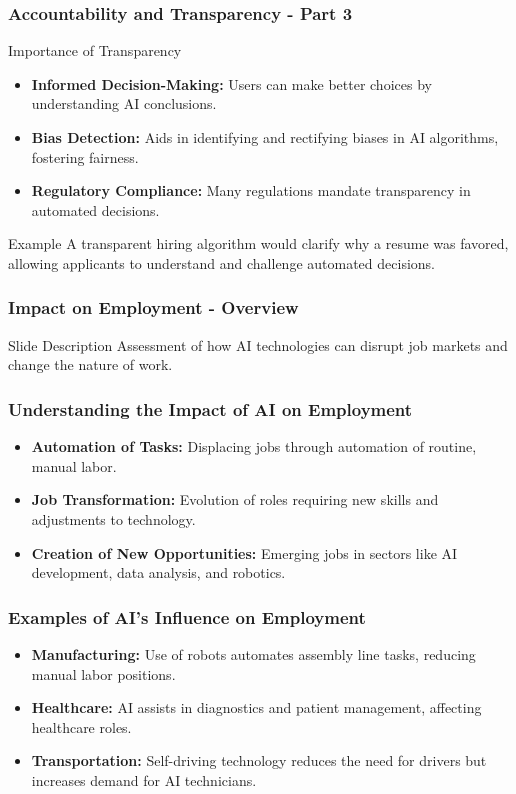 \documentclass[aspectratio=169]{beamer}
\begin{document}
\begin{frame}[fragile]
    \frametitle{Accountability and Transparency - Part 3}
    \begin{block}{Importance of Transparency}
        \begin{itemize}
            \item \textbf{Informed Decision-Making:} Users can make better choices by understanding AI conclusions.
            \item \textbf{Bias Detection:} Aids in identifying and rectifying biases in AI algorithms, fostering fairness.
            \item \textbf{Regulatory Compliance:} Many regulations mandate transparency in automated decisions.
        \end{itemize}
    \end{block}

    \begin{block}{Example}
        A transparent hiring algorithm would clarify why a resume was favored, allowing applicants to understand and challenge automated decisions.
    \end{block}
\end{frame}

\begin{frame}[fragile]
    \frametitle{Impact on Employment - Overview}
    \begin{block}{Slide Description}
        Assessment of how AI technologies can disrupt job markets and change the nature of work.
    \end{block}
\end{frame}

\begin{frame}[fragile]
    \frametitle{Understanding the Impact of AI on Employment}
    \begin{itemize}
        \item \textbf{Automation of Tasks:} Displacing jobs through automation of routine, manual labor.
        \item \textbf{Job Transformation:} Evolution of roles requiring new skills and adjustments to technology.
        \item \textbf{Creation of New Opportunities:} Emerging jobs in sectors like AI development, data analysis, and robotics.
    \end{itemize}
\end{frame}

\begin{frame}[fragile]
    \frametitle{Examples of AI's Influence on Employment}
    \begin{itemize}
        \item \textbf{Manufacturing:} Use of robots automates assembly line tasks, reducing manual labor positions.
        \item \textbf{Healthcare:} AI assists in diagnostics and patient management, affecting healthcare roles.
        \item \textbf{Transportation:} Self-driving technology reduces the need for drivers but increases demand for AI technicians.
    \end{itemize}
\end{frame}
\end{document}
